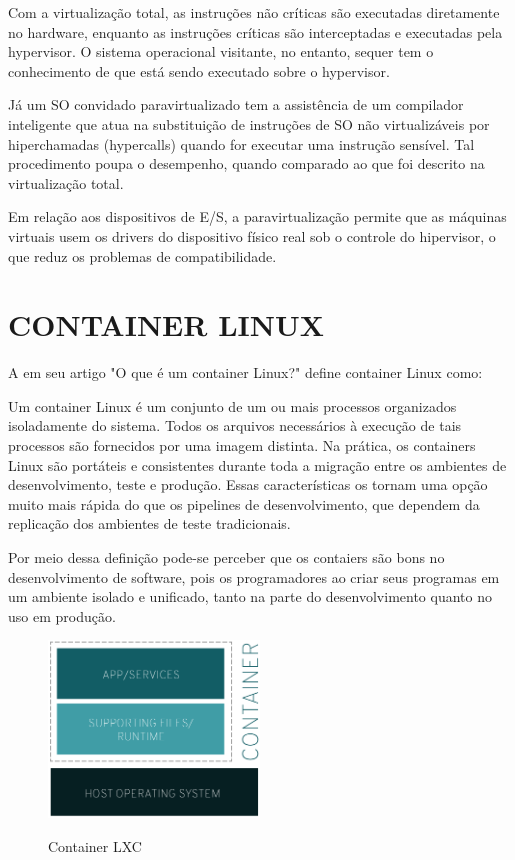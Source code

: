 Com a virtualização total, as instruções não críticas são executadas diretamente no hardware, enquanto as instruções críticas são interceptadas e executadas pela hypervisor. O sistema operacional visitante, no entanto, sequer tem o conhecimento de que está sendo executado sobre o hypervisor.

Já um SO convidado paravirtualizado tem a assistência de um compilador inteligente que atua na substituição de instruções de SO não virtualizáveis por hiperchamadas (hypercalls) quando for executar uma instrução sensível. Tal procedimento poupa o desempenho, quando comparado ao que foi descrito na virtualização total.

Em relação aos dispositivos de E/S, a paravirtualização permite que as máquinas virtuais usem os drivers do dispositivo físico real sob o controle do hipervisor, o que reduz os problemas de compatibilidade.

\section{CONTAINER LINUX}
\label{sec:linux-countainer}

A   em seu artigo "O que é um container Linux?" define container Linux como:
\begin{citacao}
	Um container Linux é um conjunto de um ou mais processos organizados isoladamente do sistema. Todos os arquivos necessários à execução de tais processos são fornecidos por uma imagem distinta. Na prática, os containers Linux são portáteis e consistentes durante toda a migração entre os ambientes de desenvolvimento, teste e produção. Essas características os tornam uma opção muito mais rápida do que os pipelines de desenvolvimento, que dependem da replicação dos ambientes de teste tradicionais.
\end{citacao}  

Por meio dessa definição pode-se perceber que os contaiers são bons no desenvolvimento de software, pois os programadores ao criar seus programas em um ambiente isolado e unificado, tanto na parte do desenvolvimento quanto no uso em produção.    

\begin{figure}[!htb]
	\centering
	\caption{Container LXC}
	\includegraphics[width=0.5\textwidth]{figuras/what-is-a-container.png}
	\label{fig:figura-exemplo1}
\end{figure}

